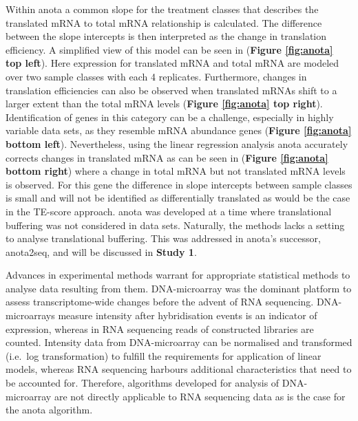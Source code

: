 \documentclass[
  12pt,
  openany]{book}
\begin{document}
Within anota a common slope for the treatment classes that describes the translated mRNA to total mRNA relationship is calculated. The difference between the slope intercepts is then interpreted as the change in translation efficiency. A simplified view of this model can be seen in (\textbf{Figure \ref{fig:anota} top left}). Here expression for translated mRNA and total mRNA are modeled over two sample classes with each 4 replicates. Furthermore, changes in translation efficiencies can also be observed when translated mRNAs shift to a larger extent than the total mRNA levels (\textbf{Figure \ref{fig:anota} top right}). Identification of genes in this category can be a challenge, especially in highly variable data sets, as they resemble mRNA abundance genes (\textbf{Figure \ref{fig:anota} bottom left}). Nevertheless, using the linear regression analysis anota accurately corrects changes in translated mRNA as can be seen in (\textbf{Figure \ref{fig:anota} bottom right}) where a change in total mRNA but not translated mRNA levels is observed. For this gene the difference in slope intercepts between sample classes is small and will not be identified as differentially translated as would be the case in the TE-score approach. anota was developed at a time where translational buffering was not considered in data sets. Naturally, the methods lacks a setting to analyse translational buffering. This was addressed in anota's successor, anota2seq, and will be discussed in \textbf{Study 1}.

Advances in experimental methods warrant for appropriate statistical methods to analyse data resulting from them. DNA-microarray was the dominant platform to assess transcriptome-wide changes before the advent of RNA sequencing. DNA-microarrays measure intensity after hybridisation events is an indicator of expression, whereas in RNA sequencing reads of constructed libraries are counted. Intensity data from DNA-microarray can be normalised and transformed (i.e.~log transformation) to fulfill the requirements for application of linear models, whereas RNA sequencing harbours additional characteristics that need to be accounted for. Therefore, algorithms developed for analysis of DNA- microarray are not directly applicable to RNA sequencing data as is the case for the anota algorithm.
\end{document}
